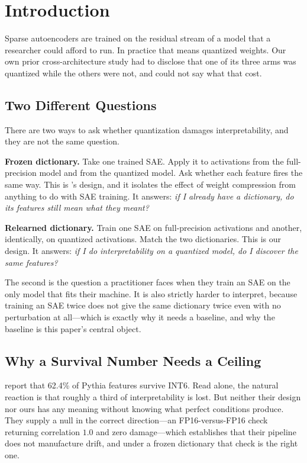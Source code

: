\documentclass[11pt,a4paper]{article}
\begin{document}
\tableofcontents
\newpage

\section{Introduction}

Sparse autoencoders are trained on the residual stream of a model that a researcher
could afford to run. In practice that means quantized weights. Our own prior
cross-architecture study \citep{melton2026sae} had to disclose that one of its three
arms was quantized while the others were not, and could not say what that cost.

\subsection{Two Different Questions}
\label{sec:twoquestions}

There are two ways to ask whether quantization damages interpretability, and they are
not the same question.

\textbf{Frozen dictionary.} Take one trained SAE. Apply it to activations from the
full-precision model and from the quantized model. Ask whether each feature fires the
same way. This is \citet{duan2026quant}'s design, and it isolates the effect of weight
compression from anything to do with SAE training. It answers: \emph{if I already have
a dictionary, do its features still mean what they meant?}

\textbf{Relearned dictionary.} Train one SAE on full-precision activations and another,
identically, on quantized activations. Match the two dictionaries. This is our design.
It answers: \emph{if I do interpretability on a quantized model, do I discover the
same features?}

The second is the question a practitioner faces when they train an SAE on the only
model that fits their machine. It is also strictly harder to interpret, because
training an SAE twice does not give the same dictionary twice even with no perturbation
at all---which is exactly why it needs a baseline, and why the baseline is this paper's
central object.

\subsection{Why a Survival Number Needs a Ceiling}

\citeauthor{duan2026quant} report that 62.4\% of Pythia features survive INT6. Read
alone, the natural reaction is that roughly a third of interpretability is lost. But
neither their design nor ours has any meaning without knowing what perfect conditions
produce. They supply a null in the correct direction---an FP16-versus-FP16 check
returning correlation $1.0$ and zero damage---which establishes that their pipeline does
not manufacture drift, and under a frozen dictionary that check is the right one.
\end{document}
